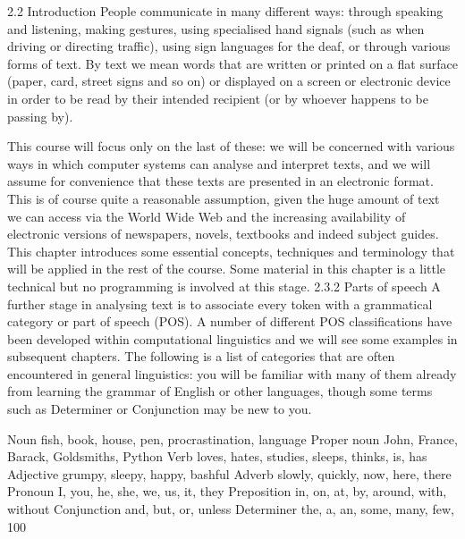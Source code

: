 2.2 Introduction
People communicate in many different ways: through speaking and listening,
making gestures, using specialised hand signals (such as when driving or directing
traffic), using sign languages for the deaf, or through various forms of text.
By text we mean words that are written or printed on a flat surface (paper, card,
street signs and so on) or displayed on a screen or electronic device in order to be
read by their intended recipient (or by whoever happens to be passing by).

This course will focus only on the last of these: we will be concerned with various
ways in which computer systems can analyse and interpret texts, and we will assume
for convenience that these texts are presented in an electronic format. This is of
course quite a reasonable assumption, given the huge amount of text we can access
via the World Wide Web and the increasing availability of electronic versions of
newspapers, novels, textbooks and indeed subject guides. This chapter introduces
some essential concepts, techniques and terminology that will be applied in the rest
of the course. Some material in this chapter is a little technical but no programming
is involved at this stage.
2.3.2 Parts of speech
A further stage in analysing text is to associate every token with a grammatical
category or part of speech (POS). A number of different POS classifications have
been developed within computational linguistics and we will see some examples in
subsequent chapters. The following is a list of categories that are often encountered
in general linguistics: you will be familiar with many of them already from learning
the grammar of English or other languages, though some terms such as Determiner
or Conjunction may be new to you.

Noun fish, book, house, pen, procrastination, language
Proper noun John, France, Barack, Goldsmiths, Python
Verb loves, hates, studies, sleeps, thinks, is, has
Adjective grumpy, sleepy, happy, bashful
Adverb slowly, quickly, now, here, there
Pronoun I, you, he, she, we, us, it, they
Preposition in, on, at, by, around, with, without
Conjunction and, but, or, unless
Determiner the, a, an, some, many, few, 100
